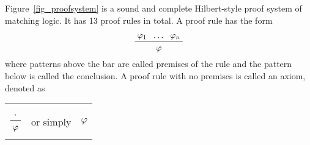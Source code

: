 \documentclass[acmsmall]{acmart}
\theoremstyle{acmdefinition}
\newcommand{\Figure}[1]{Figure~\ref{#1}}
\begin{document}
\Figure{fig_proofsystem} 
is a sound and complete Hilbert-style proof system of matching logic.
It has 13 proof rules in total.
A proof rule has the form
$$
\begin{prftree}
{\varphi_1}
{\dots}
{\varphi_n}
{\varphi}
\end{prftree}
$$
where patterns above the bar are called premises of the rule
and the pattern below is called the conclusion.
A proof rule with no premises is called an axiom,
denoted as
\begin{center}
\begin{tabular}{ccc}
$$
\begin{prftree}
{\cdot}
{\varphi}
\end{prftree}
$$
&
or simply
&
$\varphi$
\end{tabular}
\end{center}
\end{document}
